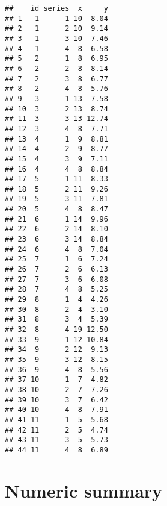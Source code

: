 \documentclass[]{book}
\newenvironment{Shaded}{\begin{snugshade}}{\end{snugshade}}
\newcommand{\KeywordTok}[1]{\textcolor[rgb]{0.13,0.29,0.53}{\textbf{{#1}}}}
\newcommand{\DataTypeTok}[1]{\textcolor[rgb]{0.13,0.29,0.53}{{#1}}}
\newcommand{\StringTok}[1]{\textcolor[rgb]{0.31,0.60,0.02}{{#1}}}
\newcommand{\NormalTok}[1]{{#1}}
\theoremstyle{definition}
\theoremstyle{definition}
\theoremstyle{remark}
\begin{document}
\begin{Shaded}
\end{Shaded}

\begin{verbatim}
##    id series  x     y
## 1   1      1 10  8.04
## 2   1      2 10  9.14
## 3   1      3 10  7.46
## 4   1      4  8  6.58
## 5   2      1  8  6.95
## 6   2      2  8  8.14
## 7   2      3  8  6.77
## 8   2      4  8  5.76
## 9   3      1 13  7.58
## 10  3      2 13  8.74
## 11  3      3 13 12.74
## 12  3      4  8  7.71
## 13  4      1  9  8.81
## 14  4      2  9  8.77
## 15  4      3  9  7.11
## 16  4      4  8  8.84
## 17  5      1 11  8.33
## 18  5      2 11  9.26
## 19  5      3 11  7.81
## 20  5      4  8  8.47
## 21  6      1 14  9.96
## 22  6      2 14  8.10
## 23  6      3 14  8.84
## 24  6      4  8  7.04
## 25  7      1  6  7.24
## 26  7      2  6  6.13
## 27  7      3  6  6.08
## 28  7      4  8  5.25
## 29  8      1  4  4.26
## 30  8      2  4  3.10
## 31  8      3  4  5.39
## 32  8      4 19 12.50
## 33  9      1 12 10.84
## 34  9      2 12  9.13
## 35  9      3 12  8.15
## 36  9      4  8  5.56
## 37 10      1  7  4.82
## 38 10      2  7  7.26
## 39 10      3  7  6.42
## 40 10      4  8  7.91
## 41 11      1  5  5.68
## 42 11      2  5  4.74
## 43 11      3  5  5.73
## 44 11      4  8  6.89
\end{verbatim}

\section*{Numeric summary}\label{numeric-summary}

\begin{Shaded}
\end{Shaded}
\end{document}
